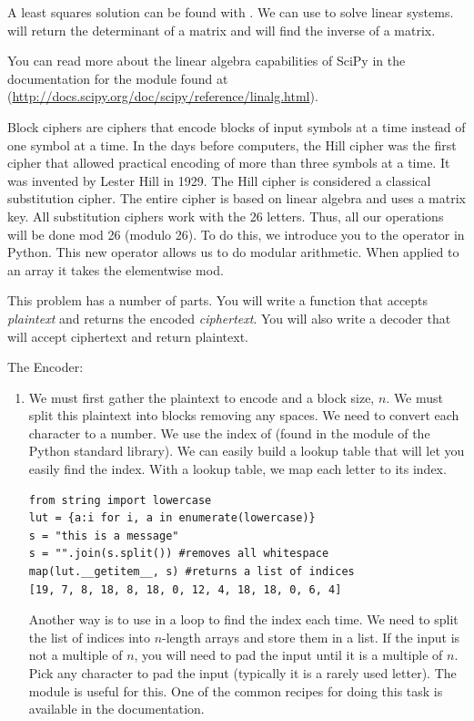 A least squares solution can be found with .
We can use  to solve linear systems.  
 will return the determinant of a matrix and 
 will find the inverse of a matrix.

You can read more about the linear algebra capabilities of SciPy in the 
documentation for the  module found at
(\url{http://docs.scipy.org/doc/scipy/reference/linalg.html}).

\begin{problem}
Block ciphers are ciphers that encode blocks of input symbols at a time 
instead of one symbol at a time. In the days before computers, the Hill 
cipher was the first cipher that allowed practical encoding of more than 
three symbols at a time. It was invented by Lester Hill in 1929.
The Hill cipher is considered a classical substitution cipher.
The entire cipher is based on linear algebra and uses a matrix key.
All substitution ciphers work with the 26 letters.
Thus, all our operations will be done mod 26 (modulo 26).
To do this, we introduce you to the \li{\%} operator in Python.
This new operator allows us to do modular arithmetic.
When applied to an array it takes the elementwise mod.

This problem has a number of parts.  You will write a function that 
accepts \emph{plaintext} and returns the encoded \emph{ciphertext}.
You will also write a decoder that will accept ciphertext and return 
plaintext.

The Encoder: \begin{enumerate}
\item We must first gather the plaintext to encode and a block size, $n$.
We must split this plaintext into blocks removing any spaces.  We need to 
convert each character to a number. We use the index of  
(found in the  module of the Python standard library).
We can easily build a lookup table that will let you easily find the index.
With a lookup table, we map each letter to its index.

\begin{lstlisting}
from string import lowercase
lut = {a:i for i, a in enumerate(lowercase)}
s = "this is a message"
s = "".join(s.split()) #removes all whitespace
map(lut.__getitem__, s) #returns a list of indices
[19, 7, 8, 18, 8, 18, 0, 12, 4, 18, 18, 0, 6, 4]
\end{lstlisting}

Another way is to use  in a loop to find the index 
each time.
We need to split the list of indices into $n$-length arrays and store them 
in a list. If the input is not a multiple of $n$, you will need to pad the 
input until it is a multiple of $n$. Pick any character to pad the input 
(typically it is a rarely used letter). The  module is useful 
for this.  One of the common recipes for doing this task is available in 
the  documentation.


\end{enumerate}
\end{problem}
